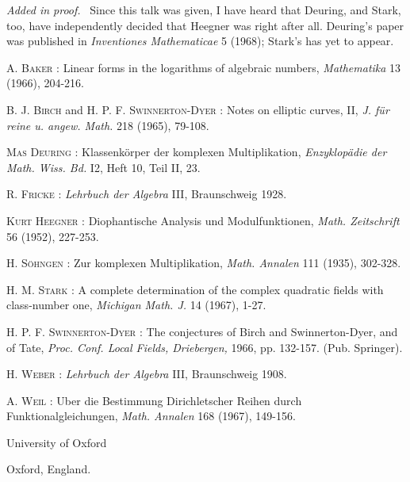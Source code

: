 \medskip
\noindent
{\em Added in proof.}~ Since this talk was given, I have heard that Deuring, and Stark, too, have independently decided that Heegner was right after all. Deuring's paper was published in {\em Inventiones Mathematicae} 5 (1968); Stark's has yet to appear.

\begin{thebibliography}{99}
 \textsc{A. Baker :} Linear forms in the logarithms of algebraic numbers, {\em Mathematika} 13 (1966), 204-216.

 \textsc{B. J. Birch} and \textsc{H. P. F. Swinnerton-Dyer :} Notes on elliptic curves, II, {\em J. f\"ur reine u. angew. Math.} 218 (1965), 79-108.

 \textsc{Mas Deuring :} Klassenk\"orper der komplexen Multiplikation, {\em Enzyklop\"adie der Math. Wiss. Bd.} I2, Heft 10, Teil II, 23.

 \textsc{R. Fricke :} {\em Lehrbuch der Algebra} III, Braunschweig 1928.

 \textsc{Kurt Heegner :} Diophantische Analysis und Modulfunktionen, {\em Math. Zeitschrift} 56 (1952), 227-253.

 \textsc{H. S\"ohngen :} Zur komplexen Multiplikation, {\em Math. Annalen} 111 (1935), 302-328.

 \textsc{H. M. Stark :} A complete determination of the complex quadratic fields with class-number one, {\em Michigan Math. J.} 14 (1967), 1-27.

 \textsc{H. P. F. Swinnerton-Dyer :} The conjectures of Birch and Swinnerton-Dyer, and of Tate, {\em Proc. Conf. Local Fields, Driebergen,} 1966, pp. 132-157. (Pub. Springer).

 \textsc{H. Weber :} {\em Lehrbuch der Algebra} III, Braunschweig 1908.

 \textsc{A. Weil :} Uber die Bestimmung Dirichletscher Reihen durch Funktionalgleichungen, {\em Math. Annalen} 168 (1967), 149-156.
\end{thebibliography}

\bigskip
\noindent
University of Oxford

\noindent
Oxford, England.


